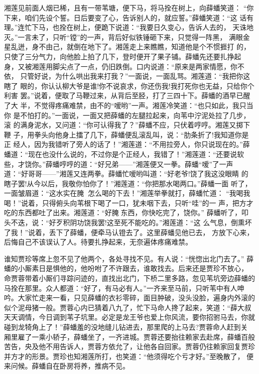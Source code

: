 湘莲见前面人烟已稀，且有一带苇塘，便下马，将马拴在树上，向薛蟠笑道：
“你下来，咱们先设个誓。日后要变了心，告诉别人的，就应誓。”薛蟠笑道：“这
话有理。”连忙下马，也拴在树上，便跪下说道：“我要日久变心，告诉人去的，
天诛地灭。”一言未了，只听“镗”的一声，背后好似铁锤砸下来，只觉得一阵黑，
满眼金星乱迸，身不由己，就倒在地下了。湘莲走上来瞧瞧，知道他是个不惯捱打
的，只使了三分气力，向他脸上拍了几下，登时便开了果子铺。薛蟠先还要扎挣起
身，又被湘莲用脚尖点了一点，仍旧跌倒。口内说道：“原来是两家情愿，你不依，
只管好说，为什么哄出我来打我？”一面说，一面乱骂。湘莲道：“我把你这瞎了
眼的，你认认柳大爷是谁!你不说哀求，你还伤我!我打死你也无益，只给你个利害
罢。”说着，便取了马鞭过来，从背后至胫，打了三四十下。薛蟠的酒早已醒了大
半，不觉得疼痛难禁，由不的“嗳哟”一声。湘莲冷笑道：“也只如此，我只当你
是不怕打的。”一面说，一面又把薛蟠的左腿拉起来，向苇中泞泥处拉了几步，滚
的满身泥水，又问道：“你可认得我了？”薛蟠不应，只伏着哼哼。湘莲又掷下鞭
子，用拳头向他身上擂了几下，薛蟠便乱滚乱叫，说：“肋条折了!我知道你是正
经人，因为我错听了旁人的话了！”湘莲道：“不用拉旁人，你只说现在的。”薛
蟠道：“现在也没什么说的，不过你是个正经人，我错了！”湘莲道：“还要说软
些，才饶你。”薛蟠哼哼的道：“好兄弟——”湘莲便又一拳。薛蟠“嗳”了一声
道：“好哥哥——”湘莲又连两拳。薛蟠忙嗳哟叫道：“好老爷!饶了我这没眼睛
的瞎子罢!从今以后，我敬你怕你了！”湘莲道：“你把那水喝两口。”薛蟠一面
听了，一面皱眉道：“这水实在腌，怎么喝的下去！”湘莲举拳就打，薛蟠忙道：
“我喝我喝！”说着，只得俯头向苇根下喝了一口，犹未咽下去，只听“哇”的一
声，把方才吃的东西都吐了出来。湘莲道：“好腌东西，你快吃完了，饶你。”
薛蟠听了，叩头不迭，说：“好歹积阴功饶我罢!这至死不能吃的。”湘莲道：“这
么气息，倒熏坏了我！”说着，丢下了薛蟠，便牵马认镫去了。这里薛蟠见他已去，
方放下心来，后悔自己不该误认了人。待要扎挣起来，无奈遍体疼痛难禁。

谁知贾珍等席上忽不见了他两个，各处寻找不见。有人说：“恍惚出北门去了。”
薛蟠的小厮素日是惧他的，他吩咐了不许跟去，谁敢找去。后来还是贾珍不放心，
命贾蓉带着小厮们寻踪问迹的，直找出北门，下桥二里多路，忽见苇坑旁边薛蟠的
马拴在那里。众人都道：“好了，有马必有人。”一齐来至马前，只听苇中有人呻
吟。大家忙走来一看，只见薛蟠的衣衫零碎，面目肿破，没头没脸，遍身内外滚的
似个泥母猪一般。贾蓉心内已猜着八九了，忙下马命人搀了起来，笑道：“薛大叔
天天调情，今日调到苇子坑里。必定是龙王爷也爱上你风流，要你招驸马去，你就
碰到龙犄角上了！”薛蟠羞的没地缝儿钻进去，那里爬的上马去?贾蓉命人赶到关
厢里雇了一乘小轿子，薛蟠坐了，一齐进城。贾蓉还要抬往赖家去赴席，薛蟠百般
苦告，央及他不用告诉人，贾蓉方依允了，让他各自回家。贾蓉仍往赖家回复贾珍
并方才的形景。贾珍也知湘莲所打，也笑道：“他须得吃个亏才好。”至晚散了，
便来问候。薛蟠自在卧房将养，推病不见。

